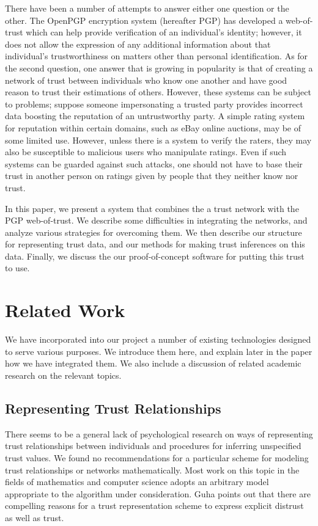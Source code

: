\documentclass[letterpaper]{www2006-submission}
\begin{document}
There have been a number of attempts to answer either one question or the other.  The OpenPGP encryption system \citep{rfc2440} (hereafter PGP) has developed a web-of-trust which can help provide verification of an individual's identity;  however, it does not allow the expression of any additional information about that individual's trustworthiness on matters other than personal identification.  As for the second question, one answer that is growing in popularity is that of creating a network of trust between individuals who know one another and have good reason to trust their estimations of others.  However, these systems can be subject to problems; suppose someone impersonating a trusted party provides incorrect data boosting the reputation of an untrustworthy party.  A simple rating system for reputation within certain domains, such as eBay online auctions, may be of some limited use.  However, unless there is a system to verify the raters, they may also be susceptible to malicious users who manipulate ratings.  Even if such systems can be guarded against such attacks, one should not have to base their trust in another person on ratings given by people that they neither know nor trust.

In this paper, we present a system that combines the a trust network with the PGP web-of-trust.  We describe some difficulties in integrating the networks, and analyze various strategies for overcoming them.  We then describe our structure for representing trust data, and our methods for making trust inferences on this data.  Finally, we discuss the our proof-of-concept software for putting this trust to use.

\section{Related Work}
We have incorporated into our project a number of existing technologies designed to serve various purposes.  We introduce them here, and explain later in the paper how we have integrated them.  We also include a discussion of related academic research on the relevant topics.

\subsection{Representing Trust Relationships}
There seems to be a general lack of psychological research on ways of representing trust relationships between individuals and procedures for inferring unspecified trust values.  We found no recommendations for a particular scheme for modeling trust relationships or networks mathematically.  Most work on this topic in the fields of mathematics and computer science adopts an arbitrary model appropriate to the algorithm under consideration. Guha points out \citep{guha04propagation} that there are compelling reasons for a trust representation scheme to express explicit distrust as well as trust.
\end{document}
